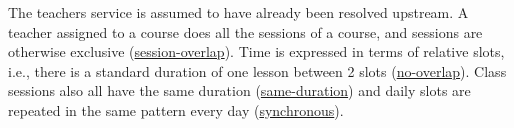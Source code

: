 The teachers service is assumed to have already been resolved upstream. A teacher assigned to a course does all the sessions of a course, and sessions are otherwise exclusive  
(\hyperref[feat:teachersessionoverlap]{session-overlap}).
Time is expressed in terms of relative slots, i.e., there is a standard duration of one lesson between 2 slots 
(\hyperref[feat:nooverlap]{no-overlap}). 
Class sessions also all have the same duration 
(\hyperref[feat:sameduration]{same-duration}) 
and daily slots are repeated in the same pattern every day 
(\hyperref[feat:synchronous]{synchronous}).

